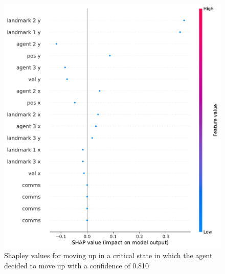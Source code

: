 \documentclass[UKenglish]{uiomasterthesis}
\begin{document}
\begin{figure}[!ht]
	\includegraphics[width=\columnwidth]{images/spread_policy_move_up_shap.pdf}
	\caption{Shapley values for moving up in a critical state in which the agent decided to move up with a confidence of 0.810}
	\label{fig:shap} 
\end{figure}
\end{document}

